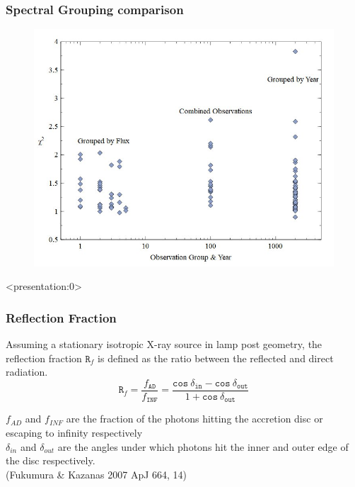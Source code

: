 \documentclass[]{beamer}
\begin{document}
\begin{frame}
\frametitle{Spectral Grouping comparison}
\begin{figure}\centering
\includegraphics[scale=.5]{Spectral_fits_chi.jpg}
\end{figure}
\end{frame}
\begin{frame} <presentation:0>
\frametitle{Reflection Fraction}
Assuming a stationary isotropic X-ray source in lamp post geometry, the reflection fraction $\texttt{R}_f$ is defined as the ratio between the reflected and direct radiation.\pause
\begin{equation}
{
\texttt{R}_f = \frac{f_{\texttt{AD}}}{f_{\texttt{INF}}} = \frac{\texttt{cos}~\delta_{\texttt{in}} - \texttt{cos}~ \delta_{\texttt{out}}}{1 + \texttt{cos}~\delta_{\texttt{out}}}
}
\end{equation}

$f_{AD}$ and $f_{INF}$ are the fraction of the photons hitting the accretion disc or escaping to infinity respectively \pause\\
\vspace{0.2cm}
$\delta_{in}$ and $\delta_{out}$ are the angles under which photons hit the inner and outer edge of the disc respectively.\\
\vspace{0.2cm}
(Fukumura \& Kazanas 2007 ApJ 664, 14)
\end{frame}
\end{document}
